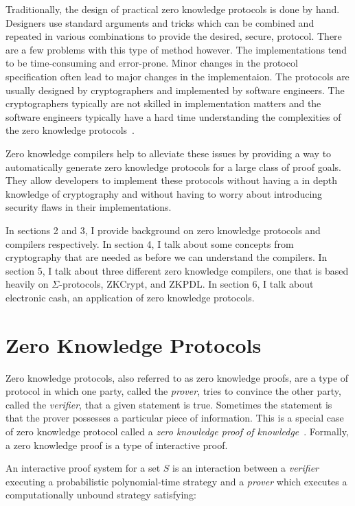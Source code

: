 \documentclass{sig-alternate}
\begin{document}
	Traditionally, the design of practical zero knowledge protocols
	is done by hand. Designers use standard arguments and tricks which
	can be combined and repeated in various combinations to provide the 
	desired, secure, protocol. There are a few problems with this type
	of method however. The implementations tend to be time-consuming
	and error-prone. Minor changes in the protocol specification often
	lead to major changes in the implementaion. The protocols are usually
	designed by cryptographers and implemented by software engineers. The
	cryptographers typically are not skilled in implementation matters and
	the software engineers typically have a hard time understanding the
	complexities of the zero knowledge protocols~\cite{Sigma:2009}. 

	Zero knowledge compilers help to alleviate these issues by providing
	a way to automatically generate zero knowledge protocols for a large
	class of proof goals. They allow developers to implement these protocols
	without having a in depth knowledge of cryptography and without having to
	worry about introducing security flaws in their implementations.

	In sections 2 and 3, I provide background on zero knowledge protocols and
	compilers respectively. In section 4, I talk about some concepts from
	cryptography that are needed as before we can understand the compilers.
	In section 5, I talk about three different zero knowledge compilers, one
	that is based heavily on $\Sigma$-protocols, ZKCrypt, and ZKPDL. In section
	6, I talk about electronic cash, an application of zero knowledge protocols.

\section{Zero Knowledge Protocols}
	Zero knowledge protocols, also referred to as zero knowledge proofs, are a type
	of protocol in which one party, called the \textit{prover}, tries to convince the 
	other party, called the \textit{verifier}, that a given statement is true. Sometimes
	the statement is that the prover possesses a particular piece of information. This
	is a special case of zero knowledge protocol called a \textit{zero knowledge proof
	of knowledge}~\cite{Wiki}. Formally, a zero knowledge proof is a type of interactive
	proof.
	
	An interactive proof system for a set $S$ is an interaction between a
	\textit{verifier} executing a probabilistic polynomial-time strategy and
	a \textit{prover} which executes a computationally unbound strategy 
	satisfying:
			
\end{document}
